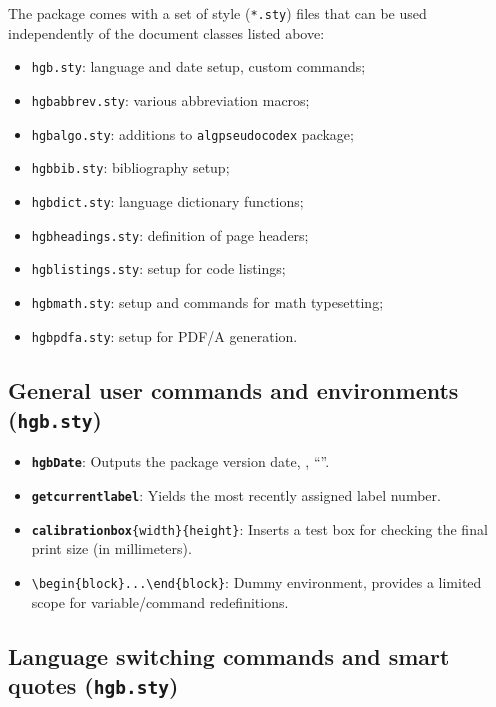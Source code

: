 \documentclass[language=english]{hgbarticle}
\begin{document}
The package comes with a set of style (\texttt{*.sty}) files that can be used
independently of the document classes listed above:
\begin{itemize}
  \item \texttt{hgb.sty}: language and date setup, custom commands;
  \item \texttt{hgbabbrev.sty}: various abbreviation macros;
  \item \texttt{hgbalgo.sty}: additions to \texttt{algpseudocodex} package;
  \item \texttt{hgbbib.sty}: bibliography setup;
  \item \texttt{hgbdict.sty}: language dictionary functions;
  \item \texttt{hgbheadings.sty}: definition of page headers;
  \item \texttt{hgblistings.sty}: setup for code listings;
  \item \texttt{hgbmath.sty}: setup and commands for math typesetting;
  \item \texttt{hgbpdfa.sty}: setup for PDF/A generation.
\end{itemize}

\subsection{General user commands and environments (\texttt{hgb.sty})}
\label{sec:GeneralUserCommands}

\begin{itemize}
   \item \textbf{\texttt{{\bs}hgbDate}}: Outputs the package version date,
    \eg, ``\texttt{\hgbDate}''.
	\item \textbf{\texttt{{\bs}getcurrentlabel}}:
			Yields the most recently assigned label number.
   \item \textbf{\texttt{{\bs}calibrationbox}}\verb!{width}{height}!:
			Inserts a test box for checking the final print size (in millimeters).
	\item \verb!\begin{block}...\end{block}!:
			Dummy environment, provides a limited scope for variable/command redefinitions.
\end{itemize}


\subsection{Language switching commands and smart quotes (\texttt{hgb.sty})}
\label{sec:LanguageSwitchingCommands}
\end{document}
